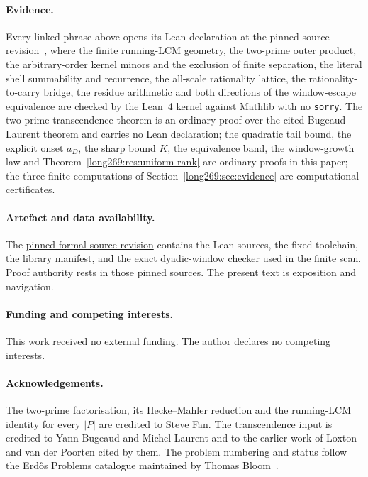 \paragraph{Evidence.}  Every linked phrase above opens its Lean declaration at
the pinned source revision~\commitshort, where the finite running-LCM geometry,
the two-prime outer product, the arbitrary-order kernel minors and the
exclusion of finite separation, the literal shell summability and recurrence,
the all-scale rationality lattice, the rationality-to-carry bridge, the residue
arithmetic and both directions of the window-escape equivalence are checked by
the Lean~4 kernel against Mathlib with no \texttt{sorry}.  The two-prime
transcendence theorem is an ordinary proof over the cited Bugeaud--Laurent
theorem and carries no Lean declaration; the quadratic tail bound, the explicit
onset $a_D$, the sharp bound $K$, the equivalence band, the window-growth law
and Theorem~\ref{long269:res:uniform-rank} are ordinary proofs in this paper; the three
finite computations of Section~\ref{long269:sec:evidence} are computational
certificates.

\paragraph{Artefact and data availability.} The
\href{\sourceurl}{pinned formal-source revision} contains the Lean sources, the
fixed toolchain, the library manifest, and the exact dyadic-window checker used
in the finite scan.  Proof authority rests in those pinned sources.  The
present text is exposition and navigation.

\paragraph{Funding and competing interests.} This work received no external
funding.  The author declares no competing interests.

\paragraph{Acknowledgements.} The two-prime factorisation, its Hecke--Mahler
reduction and the running-LCM identity for every $|P|$ are credited to Steve
Fan.  The transcendence input is credited to Yann Bugeaud and Michel Laurent
and to the earlier work of Loxton and van der Poorten cited by them.  The
problem numbering and status follow the Erd\H{o}s Problems catalogue maintained
by Thomas Bloom~\cite{erdosproblems}.
